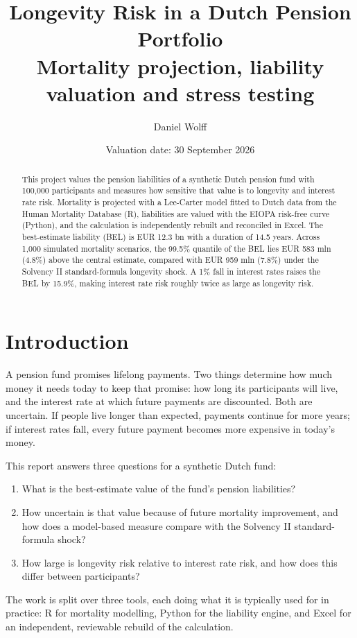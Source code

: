 \documentclass[11pt,a4paper]{article}
\title{\textbf{Longevity Risk in a Dutch Pension Portfolio}\\[2pt]
\large Mortality projection, liability valuation and stress testing}
\author{Daniel Wolff}
\date{Valuation date: 30 September 2026}
\begin{document}
\maketitle

\begin{abstract}
\noindent
This project values the pension liabilities of a synthetic Dutch pension fund with 100{,}000
participants and measures how sensitive that value is to longevity and interest rate risk.
Mortality is projected with a Lee-Carter model fitted to Dutch data from the Human Mortality
Database (R), liabilities are valued with the EIOPA risk-free curve (Python), and the
calculation is independently rebuilt and reconciled in Excel. The best-estimate liability (BEL)
is EUR 12.3 bn with a duration of 14.5 years. Across 1{,}000 simulated mortality scenarios, the
99.5\% quantile of the BEL lies EUR 583 mln (4.8\%) above the central estimate, compared with
EUR 959 mln (7.8\%) under the Solvency II standard-formula longevity shock. A 1\% fall in
interest rates raises the BEL by 15.9\%, making interest rate risk roughly twice as large as
longevity risk.
\end{abstract}

\section{Introduction}

A pension fund promises lifelong payments. Two things determine how much money it needs today
to keep that promise: how long its participants will live, and the interest rate at which future
payments are discounted. Both are uncertain. If people live longer than expected, payments
continue for more years; if interest rates fall, every future payment becomes more expensive
in today's money.

This report answers three questions for a synthetic Dutch fund:
\begin{enumerate}
  \item What is the best-estimate value of the fund's pension liabilities?
  \item How uncertain is that value because of future mortality improvement, and how does a
        model-based measure compare with the Solvency II standard-formula shock?
  \item How large is longevity risk relative to interest rate risk, and how does this differ
        between participants?
\end{enumerate}

The work is split over three tools, each doing what it is typically used for in practice:
R for mortality modelling, Python for the liability engine, and Excel for an independent,
reviewable rebuild of the calculation.
\end{document}
